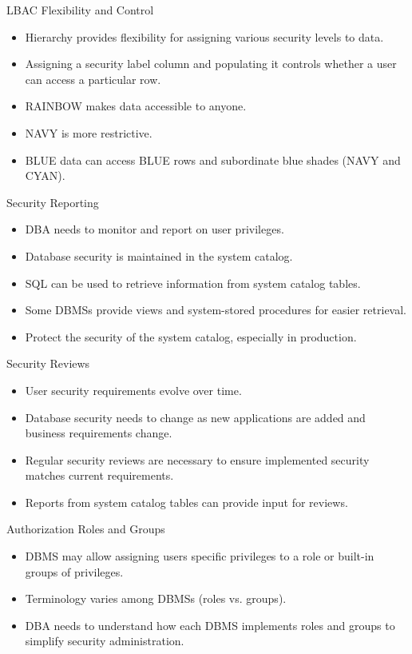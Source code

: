 \documentclass{beamer}
\begin{document}
\begin{frame}{LBAC Flexibility and Control}
    \begin{itemize}
        \item Hierarchy provides flexibility for assigning various security levels to data.
        \item Assigning a security label column and populating it controls whether a user can access a particular row.
        \item RAINBOW makes data accessible to anyone.
        \item NAVY is more restrictive.
        \item BLUE data can access BLUE rows and subordinate blue shades (NAVY and CYAN).
    \end{itemize}
\end{frame}

\begin{frame}{Security Reporting}
    \begin{itemize}
        \item DBA needs to monitor and report on user privileges.
        \item Database security is maintained in the system catalog.
        \item SQL can be used to retrieve information from system catalog tables.
        \item Some DBMSs provide views and system-stored procedures for easier retrieval.
        \item Protect the security of the system catalog, especially in production.
    \end{itemize}
\end{frame}

\begin{frame}{Security Reviews}
    \begin{itemize}
        \item User security requirements evolve over time.
        \item Database security needs to change as new applications are added and business requirements change.
        \item Regular security reviews are necessary to ensure implemented security matches current requirements.
        \item Reports from system catalog tables can provide input for reviews.
    \end{itemize}
\end{frame}

\begin{frame}{Authorization Roles and Groups}
    \begin{itemize}
        \item DBMS may allow assigning users specific privileges to a role or built-in groups of privileges.
        \item Terminology varies among DBMSs (roles vs. groups).
        \item DBA needs to understand how each DBMS implements roles and groups to simplify security administration.
    \end{itemize}
\end{frame}
\end{document}
